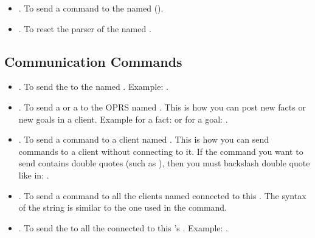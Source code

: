 \begin{itemize}
\item {}. To send a  command
to the \CPK{} named  ().

\item {}. To reset the parser of the
\CPK{} named .

\end{itemize}

\subsection{\OPRSS{} Communication Commands}

\begin{itemize}

\item {}. To send the  to the
\COPRS{} named . \*
Example: .

\item {}. To send a  or a
 to the OPRS named . This is how you can post new facts
or new goals in a \COPRS{} client. \*
Example for a fact:  or for a goal: .

\item {}. To send a  command
to a \COPRS{} client named . This is how you can send commands to a
\COPRS{} client without connecting to it. If the command you want to send
contains double quotes (such as ), then you
must backslash double quote like in: .

\item {}. To send a  command
to all the \CPK{} clients named connected to this \OPRSS{}. The syntax of the
string is similar to the one used in the  command.

\item {}. To send the  to
all the \COPRS{} connected to this \OPRSS{}'s \MP{}. \*
Example: .

\end{itemize}

